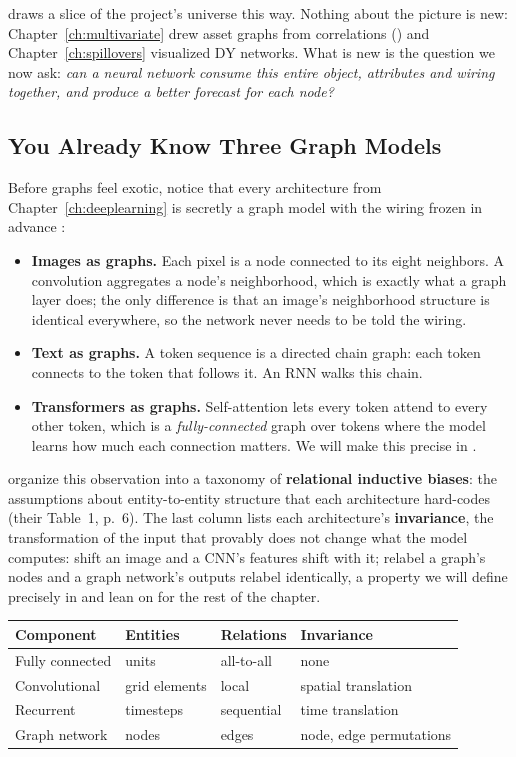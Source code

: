  draws a slice of the project's universe this way. Nothing about the picture is new: Chapter~\ref{ch:multivariate} drew asset graphs from correlations () and Chapter~\ref{ch:spillovers} visualized DY networks. What is new is the question we now ask: \emph{can a neural network consume this entire object, attributes and wiring together, and produce a better forecast for each node?}

\subsection{You Already Know Three Graph Models}

Before graphs feel exotic, notice that every architecture from Chapter~\ref{ch:deeplearning} is secretly a graph model with the wiring frozen in advance \citep{SanchezLengeling2021}:

\begin{itemize}[nosep]
  \item \textbf{Images as graphs.} Each pixel is a node connected to its eight neighbors. A convolution aggregates a node's neighborhood, which is exactly what a graph layer does; the only difference is that an image's neighborhood structure is identical everywhere, so the network never needs to be told the wiring.
  \item \textbf{Text as graphs.} A token sequence is a directed chain graph: each token connects to the token that follows it. An RNN walks this chain.
  \item \textbf{Transformers as graphs.} Self-attention lets every token attend to every other token, which is a \emph{fully-connected} graph over tokens where the model learns how much each connection matters. We will make this precise in .
\end{itemize}

\citet{Battaglia2018} organize this observation into a taxonomy of \textbf{relational inductive biases}: the assumptions about entity-to-entity structure that each architecture hard-codes (their Table~1, p.~6). The last column lists each architecture's \textbf{invariance}, the transformation of the input that provably does not change what the model computes: shift an image and a CNN's features shift with it; relabel a graph's nodes and a graph network's outputs relabel identically, a property we will define precisely in  and lean on for the rest of the chapter.

\begin{center}
\begin{tabular}{@{}llll@{}}
\toprule
Component & Entities & Relations & Invariance \\
\midrule
Fully connected & units & all-to-all & none \\
Convolutional & grid elements & local & spatial translation \\
Recurrent & timesteps & sequential & time translation \\
Graph network & nodes & edges & node, edge permutations \\
\bottomrule
\end{tabular}
\end{center}


